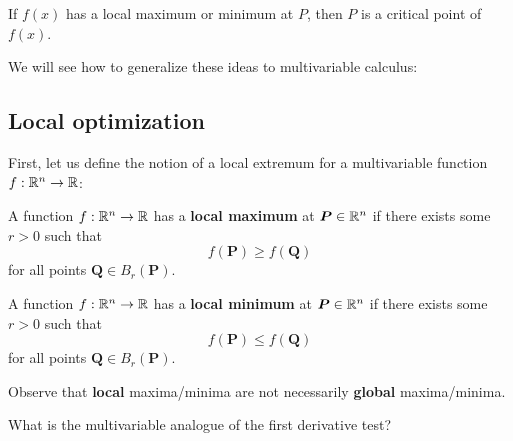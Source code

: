     \begin{theorem}
        If $f(x)$ has a local maximum or minimum at $P$, then $P$ is a critical point of $f(x)$.
    \end{theorem}

We will see how to generalize these ideas to multivariable calculus:

\subsection{Local optimization}

First, let us define the notion of a local extremum for a multivariable function $f: \mathbb{R}^n \to \mathbb{R}$:

\begin{definition}
    A function $f: \mathbb{R}^n \to \mathbb{R}$ has a \textbf{local maximum} at $\bm{P} \in \mathbb{R}^n$ if there exists some $r>0$ such that
    $$f(\bm{P}) \geq f(\bm{Q})$$
    for all points $\bm{Q} \in B_r(\bm{P})$.
    \end{definition}

    \begin{definition}
    A function $f: \mathbb{R}^n \to \mathbb{R}$ has a \textbf{local minimum} at $\bm{P} \in \mathbb{R}^n$ if there exists some $r>0$ such that
    $$f(\bm{P}) \leq f(\bm{Q})$$
    for all points $\bm{Q} \in B_r(\bm{P})$.
    \end{definition}


\begin{remark}
    Observe that \textbf{local} maxima/minima are not necessarily \textbf{global} maxima/minima.
    \end{remark}
    
    \begin{center}
    \end{center}


\begin{motivating}
    What is the multivariable analogue of the first derivative test?
\end{motivating}

